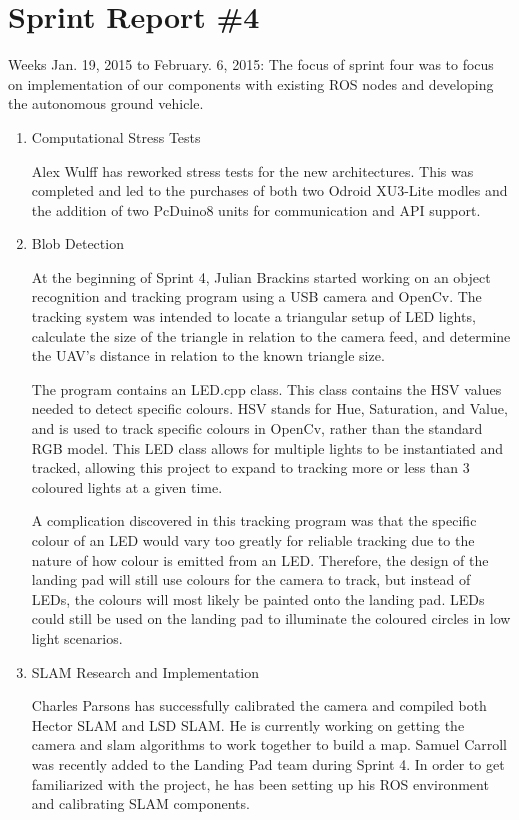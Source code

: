 \section{Sprint Report \#4}

Weeks Jan. 19, 2015 to February. 6, 2015:
The focus of sprint four was to focus on implementation of our components with existing ROS nodes and developing the autonomous ground vehicle.

\begin{enumerate}

\item Computational Stress Tests

Alex Wulff has reworked stress tests for the new architectures.  This was completed and led to the purchases of both two Odroid XU3-Lite modles and the addition of two PcDuino8 units for communication and API support.

\item Blob Detection

At the beginning of Sprint 4, Julian Brackins started working on an object recognition and tracking program using a USB camera and OpenCv. The tracking system was intended to locate a triangular setup of LED lights, calculate the size of the triangle in relation to the camera feed, and determine the UAV's distance in relation to the known triangle size.

The program contains an LED.cpp class. This class contains the HSV values needed to detect specific colours. HSV stands for Hue, Saturation, and Value, and is used to track specific colours in OpenCv, rather than the standard RGB model. This LED class allows for multiple lights to be instantiated and tracked, allowing this project to expand to tracking more or less than 3 coloured lights at a given time.

A complication discovered in this tracking program was that the specific colour of an LED would vary too greatly for reliable tracking due to the nature of how colour is emitted from an LED. Therefore, the design of the landing pad will still use colours for the camera to track, but instead of LEDs, the colours will most likely be painted onto the landing pad. LEDs could still be used on the landing pad to illuminate the coloured circles in low light scenarios.

\item SLAM Research and Implementation

Charles Parsons has successfully calibrated the camera and compiled both Hector SLAM and LSD SLAM. He is currently working on getting the camera and slam algorithms to work together to build a map.
Samuel Carroll was recently added to the Landing Pad team during Sprint 4. In order to get familiarized with the project, he has been setting up his ROS environment and calibrating SLAM components.


\end{enumerate}
